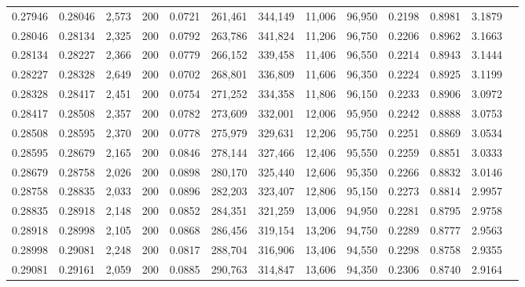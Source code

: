 \begin{tabular}{rrrrrrrrrrrrr}
0.27946 & 0.28046 &  2,573 & 200 &                                     0.0721 & 261,461 & 344,149 &  11,006 &  96,950 & 0.2198 & 0.8981 & 3.1879 \\
0.28046 & 0.28134 &  2,325 & 200 &                                     0.0792 & 263,786 & 341,824 &  11,206 &  96,750 & 0.2206 & 0.8962 & 3.1663 \\
0.28134 & 0.28227 &  2,366 & 200 &                                     0.0779 & 266,152 & 339,458 &  11,406 &  96,550 & 0.2214 & 0.8943 & 3.1444 \\
0.28227 & 0.28328 &  2,649 & 200 &                                     0.0702 & 268,801 & 336,809 &  11,606 &  96,350 & 0.2224 & 0.8925 & 3.1199 \\
0.28328 & 0.28417 &  2,451 & 200 &                                     0.0754 & 271,252 & 334,358 &  11,806 &  96,150 & 0.2233 & 0.8906 & 3.0972 \\
0.28417 & 0.28508 &  2,357 & 200 &                                     0.0782 & 273,609 & 332,001 &  12,006 &  95,950 & 0.2242 & 0.8888 & 3.0753 \\
0.28508 & 0.28595 &  2,370 & 200 &                                     0.0778 & 275,979 & 329,631 &  12,206 &  95,750 & 0.2251 & 0.8869 & 3.0534 \\
0.28595 & 0.28679 &  2,165 & 200 &                                     0.0846 & 278,144 & 327,466 &  12,406 &  95,550 & 0.2259 & 0.8851 & 3.0333 \\
0.28679 & 0.28758 &  2,026 & 200 &                                     0.0898 & 280,170 & 325,440 &  12,606 &  95,350 & 0.2266 & 0.8832 & 3.0146 \\
0.28758 & 0.28835 &  2,033 & 200 &                                     0.0896 & 282,203 & 323,407 &  12,806 &  95,150 & 0.2273 & 0.8814 & 2.9957 \\
0.28835 & 0.28918 &  2,148 & 200 &                                     0.0852 & 284,351 & 321,259 &  13,006 &  94,950 & 0.2281 & 0.8795 & 2.9758 \\
0.28918 & 0.28998 &  2,105 & 200 &                                     0.0868 & 286,456 & 319,154 &  13,206 &  94,750 & 0.2289 & 0.8777 & 2.9563 \\
0.28998 & 0.29081 &  2,248 & 200 &                                     0.0817 & 288,704 & 316,906 &  13,406 &  94,550 & 0.2298 & 0.8758 & 2.9355 \\
0.29081 & 0.29161 &  2,059 & 200 &                                     0.0885 & 290,763 & 314,847 &  13,606 &  94,350 & 0.2306 & 0.8740 & 2.9164 \\

\end{tabular}
